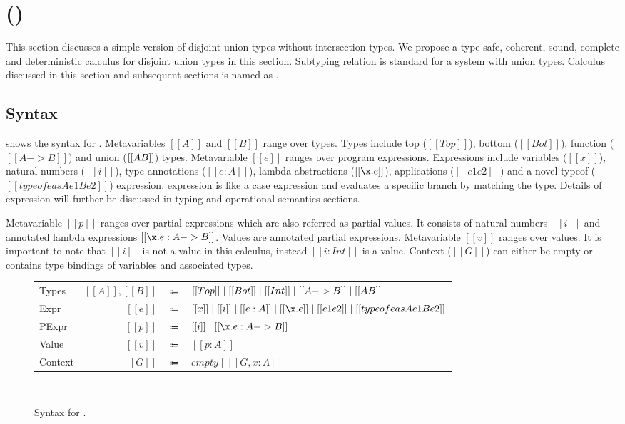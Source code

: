 \section{\dut (\cal)}
\label{sec:union}

This section discusses a simple version of disjoint union types without intersection types. We propose a type-safe, coherent, sound, complete and deterministic calculus for disjoint union types in this section. Subtyping relation is standard for a system with union types. Calculus discussed in this section and subsequent sections is named as \cal.


\subsection{Syntax}
\label{sec:union:syntax}
 shows the syntax for \cal. Metavariables $[[A]]$ and $[[B]]$ range over types.
Types include top ($[[Top]]$), bottom ($[[Bot]]$), function ($[[A -> B]]$) and union ($[[A \/ B]]$) types.
Metavariable $[[e]]$ ranges over program expressions. Expressions include variables ($[[x]]$), natural numbers ($[[i]]$), type annotations ($[[e:A]]$), lambda abstractions ($[[\x.e]]$), applications ($[[e1 e2]]$) and a novel typeof ($[[typeof e as A e1 B e2]]$) expression. \Typeof expression is like a case expression and evaluates a specific branch by matching the type. Details of \typeof expression will further be discussed in typing and operational semantics sections.

Metavariable $[[p]]$ ranges over partial expressions which are also referred as partial values.
It consists of natural numbers $[[i]]$ and annotated lambda expressions $[[\x.e : A -> B]]$.
Values are annotated partial expressions. Metavariable $[[v]]$ ranges over values. It is important to
note that $[[i]]$ is not a value in this calculus, instead $[[i:Int]]$ is a value.
Context ($[[G]]$) can either be empty or contains type bindings of variables and associated types. 

\begin{figure}[t]
  \begin{small}
    \centering
    \begin{tabular}{lrcl} \toprule
      Types & $[[A]], [[B]]$ & $\Coloneqq$ & $ [[Top]] \mid [[Bot]] \mid [[Int]] \mid [[A -> B]] \mid [[A \/ B]] $ \\
      Expr & $[[e]]$ & $\Coloneqq$ & $[[x]] \mid [[i]] \mid [[e:A]] \mid [[\x.e]] \mid [[e1 e2]] \mid [[typeof e as A e1 B e2]]$\\
      PExpr & $[[p]]$ & $\Coloneqq$ & $[[i]] \mid [[\x.e : A -> B]] $\\
      Value & $[[v]]$ & $\Coloneqq$ & $[[p:A]]$\\
      Context & $[[G]]$ & $\Coloneqq$ & $ empty \mid [[G , x : A]]$ \\
      \bottomrule
    \end{tabular}
  \end{small}\\
  \caption{Syntax for \dut.}
  \label{fig:union:syntax}
\end{figure}

